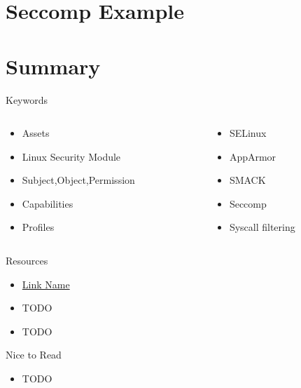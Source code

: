 \documentclass{curs}
\begin{document}
\section{Seccomp Example}

\section{Summary}

\begin{frame}{Keywords}
  \begin{columns}
    \begin{column}{0.5\textwidth}
      \begin{itemize}
        \item Assets
        \item Linux Security Module
        \item Subject,Object,Permission
        \item Capabilities
        \item Profiles
        
      \end{itemize}
    \end{column}
    \begin{column}{0.5\textwidth}
      \begin{itemize}
        \item SELinux
        \item AppArmor
        \item SMACK
        \item Seccomp
        \item Syscall filtering
      \end{itemize}
    \end{column}
  \end{columns}
\end{frame}

\begin{frame}{Resources}
  \begin{itemize}
    \item \href{https://link.url.com/}{Link Name}
    \item TODO
    \item TODO
  \end{itemize}
\end{frame}

\begin{frame}{Nice to Read}
  \begin{itemize}
    \item TODO
  \end{itemize}
\end{frame}
\end{document}
